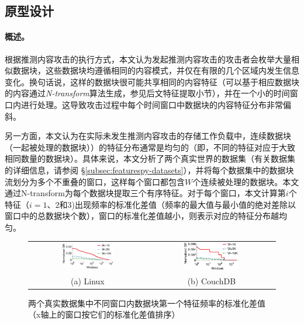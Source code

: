 \subsection{原型设计}
\label{subsec:featurespy-basic}

\paragraph*{概述。} 

根据推测内容攻击的执行方式，本文认为发起推测内容攻击的攻击者会枚举大量相似数据块，这些数据块均遵循相同的内容模式，并仅在有限的几个区域内发生信息变化。换句话说，这样的数据块很可能共享相同的内容特征（可以基于相应数据块的内容通过{\em N-transform}\cite{shilane12}算法生成，参见后文特征提取小节），并在一个小的时间窗口内进行处理。这导致攻击过程中每个时间窗口中数据块的内容特征分布非常偏斜。

另一方面，本文认为在实际未发生推测内容攻击的存储工作负载中，连续数据块（一起被处理的数据块）\cite{zhu2008avoiding}）的特征分布通常是均匀的（即，不同的特征对应于大致相同数量的数据块）。具体来说，本文分析了两个真实世界的数据集（有关数据集的详细信息，请参阅 \S\ref{subsec:featurespy-datasets}），并将每个数据集中的数据块流划分为多个不重叠的窗口，这样每个窗口都包含$W$个连续被处理的数据块。本文通过N-transform\cite{shilane12}为每个数据块提取三个有序特征。对于每个窗口，本文计算第$i$个特征（$i=1$、$2$和$3$)出现频率的标准化差值（频率的最大值与最小值的绝对差除以窗口中的总数据块个数），窗口的标准化差值越小，则表示对应的特征分布越均匀。

\begin{figure}[!htb]
    \centering
    \begin{tabular}{cc}
      \includegraphics[width=0.45\textwidth]{pic/featurespy/plot/featureDistribution/featureDistributionLinux.pdf} &
      \includegraphics[width=0.45\textwidth]{pic/featurespy/plot/featureDistribution/featureDistributionCouchbase.pdf} \\
      {\small (a) Linux} & {\small (b) CouchDB} \\
      \end{tabular}
    \caption{两个真实数据集中不同窗口内数据块第一个特征频率的标准化差值（x轴上的窗口按它们的标准化差值排序）}
    \label{fig:featurespy-featureDistribution}
\end{figure}

